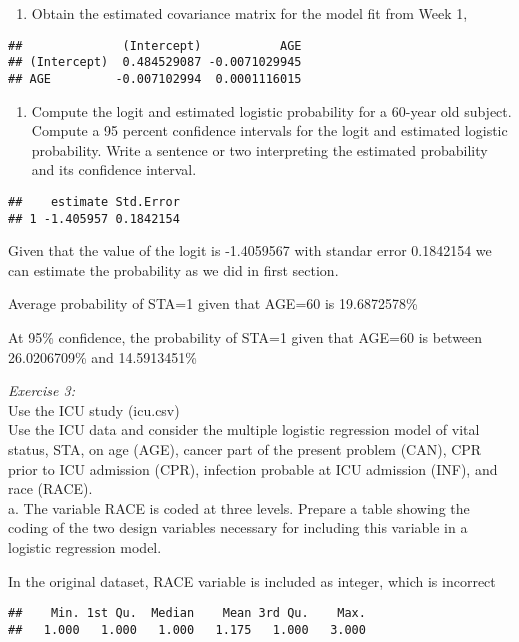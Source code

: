 \documentclass[]{article}
\begin{document}
\begin{enumerate}
\def\labelenumi{\alph{enumi}.}
\setcounter{enumi}{1}
\itemsep1pt\parskip0pt
\item
  Obtain the estimated covariance matrix for the model fit from Week 1,
\end{enumerate}

\begin{verbatim}
##              (Intercept)           AGE
## (Intercept)  0.484529087 -0.0071029945
## AGE         -0.007102994  0.0001116015
\end{verbatim}

\begin{enumerate}
\def\labelenumi{\alph{enumi}.}
\setcounter{enumi}{3}
\itemsep1pt\parskip0pt
\item
  Compute the logit and estimated logistic probability for a 60-year old
  subject. Compute a 95 percent confidence intervals for the logit and
  estimated logistic probability. Write a sentence or two interpreting
  the estimated probability and its confidence interval.
\end{enumerate}

\begin{verbatim}
##    estimate Std.Error
## 1 -1.405957 0.1842154
\end{verbatim}

Given that the value of the logit is -1.4059567 with standar error
0.1842154 we can estimate the probability as we did in first section.

Average probability of STA=1 given that AGE=60 is 19.6872578\%

At 95\% confidence, the probability of STA=1 given that AGE=60 is
between 26.0206709\% and 14.5913451\%

\emph{Exercise 3:}\\Use the ICU study (icu.csv)\\Use the ICU data and
consider the multiple logistic regression model of vital status, STA, on
age (AGE), cancer part of the present problem (CAN), CPR prior to ICU
admission (CPR), infection probable at ICU admission (INF), and race
(RACE).\\a. The variable RACE is coded at three levels. Prepare a table
showing the coding of the two design variables necessary for including
this variable in a logistic regression model.

In the original dataset, RACE variable is included as integer, which is
incorrect

\begin{verbatim}
##    Min. 1st Qu.  Median    Mean 3rd Qu.    Max. 
##   1.000   1.000   1.000   1.175   1.000   3.000
\end{verbatim}
\end{document}
